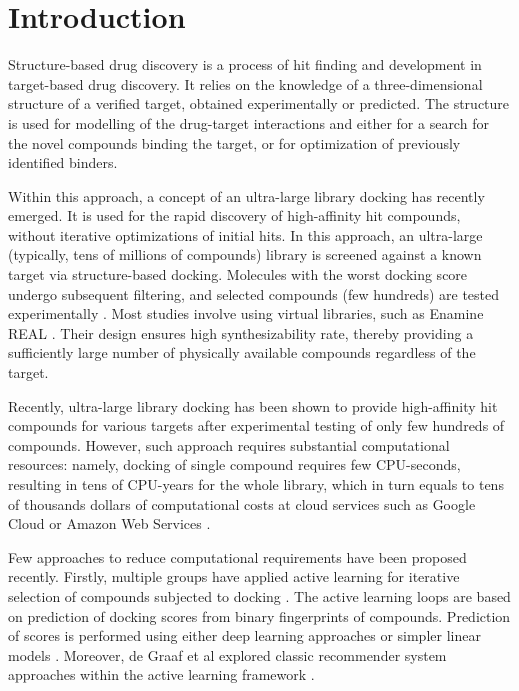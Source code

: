 \section{Introduction}

Structure-based drug discovery is a process of hit finding and development in target-based drug discovery. It relies on the knowledge of a three-dimensional structure of a verified target, obtained experimentally or predicted. The structure is used for modelling of the drug-target interactions and either for a search for the novel compounds binding the target, or for optimization of previously identified binders.

Within this approach, a concept of an ultra-large library docking has recently emerged. It is used for the rapid discovery of high-affinity hit compounds, without iterative optimizations of initial hits. In this approach, an ultra-large (typically, tens of millions of compounds) library is screened against a known target via structure-based docking. Molecules with the worst docking score undergo subsequent filtering, and selected compounds (few hundreds) are tested experimentally \cite{bender_practical_2021}. Most studies involve using virtual libraries, such as Enamine REAL \cite{noauthor_real_nodate}. Their design ensures high synthesizability rate, thereby providing a sufficiently large number of physically available compounds regardless of the target.

Recently, ultra-large library docking has been shown to provide high-affinity hit compounds for various targets \cite{sigma2_paper, melatonin_paper, ultralarge_docking_first, gorgulla_open-source_2020, beroza_chemical_2022, noauthor_large_nodate, lu_structure-guided_2021, sadybekov_synthon-based_2022, sadybekov_structure-based_2020} after experimental testing of only few hundreds of compounds. However, such approach requires substantial computational resources: namely, docking of single compound requires few CPU-seconds, resulting in tens of CPU-years for the whole library, which in turn equals to tens of thousands dollars of computational costs at cloud services such as Google Cloud or Amazon Web Services \cite{irwin_large_2023,grebner_virtual_2020}.

Few approaches to reduce computational requirements have been proposed recently. Firstly, multiple groups have applied active learning for iterative selection of compounds subjected to docking \cite{Graff2021AcceleratingLearning,autoencoders_guided_learning,logistic_regression,deepdocking,leandocking,Yang2021_shoichet_active_learning}. The active learning loops are based on prediction of docking scores from binary fingerprints of compounds. Prediction of scores is performed using either deep learning approaches \cite{deepdocking,Yang2021_shoichet_active_learning,autoencoders_guided_learning, Graff2021AcceleratingLearning} or simpler linear models \cite{leandocking,logistic_regression}. Moreover, de Graaf et al explored classic recommender system approaches within the active learning framework \cite{Graff2021AcceleratingLearning}. 

